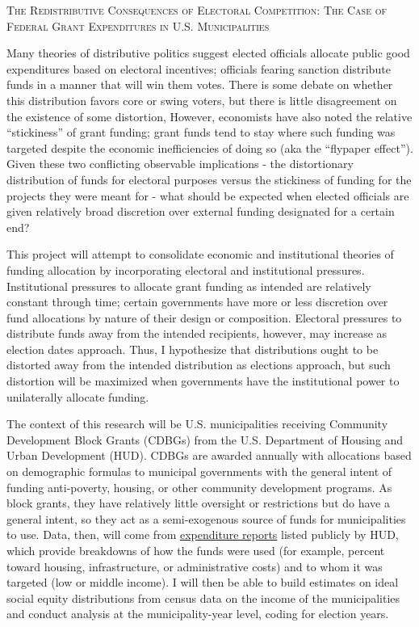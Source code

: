 \documentclass[12pt,a4paper]{article}
\begin{document}
\begin{center}
	\textsc{The Redistributive Consequences of Electoral Competition: The Case of Federal Grant Expenditures in U.S. Municipalities}
\end{center}

\par Many theories of distributive politics suggest elected officials allocate public good expenditures based on electoral incentives; officials fearing sanction distribute funds in a manner that will win them votes. There is some debate on whether this distribution favors core or swing voters, but there is little disagreement on the existence of some distortion, However, economists have also noted the relative ``stickiness'' of grant funding; grant funds tend to stay where such funding was targeted despite the economic inefficiencies of doing so (aka the ``flypaper effect''). Given these two conflicting observable implications - the distortionary distribution of funds for electoral purposes versus the stickiness of funding for the projects they were meant for - what should be expected when elected officials are given relatively broad discretion over external funding designated for a certain end?

\par This project will attempt to consolidate economic and institutional theories of funding allocation by incorporating electoral and institutional pressures. Institutional pressures to allocate grant funding as intended are relatively constant through time; certain governments have more or less discretion over fund allocations by nature of their design or composition. Electoral pressures to distribute funds away from the intended recipients, however, may increase as election dates approach. Thus, I hypothesize that distributions ought to be distorted away from the intended distribution as elections approach, but such distortion will be maximized when governments have the institutional power to unilaterally allocate funding.

\par The context of this research will be U.S. municipalities receiving Community Development Block Grants (CDBGs) from the U.S. Department of Housing and Urban Development (HUD). CDBGs are awarded annually with allocations based on demographic formulas to municipal governments with the general intent of funding anti-poverty, housing, or other community development programs. As block grants, they have relatively little oversight or restrictions but do have a general intent, so they act as a semi-exogenous source of funds for municipalities to use. Data, then, will come from \href{https://www.hudexchange.info/programs/cdbg/cdbg-expenditure-reports/}{expenditure reports} listed publicly by HUD, which provide breakdowns of how the funds were used (for example, percent toward housing, infrastructure, or administrative costs) and to whom it was targeted (low or middle income). I will then be able to build estimates on ideal social equity distributions from census data on the income of the municipalities and conduct analysis at the municipality-year level, coding for election years.
\end{document}
